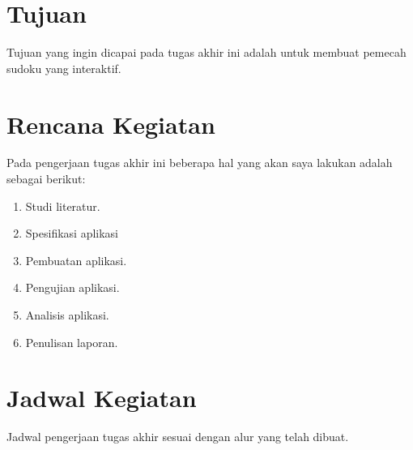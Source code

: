 \section{Tujuan}

Tujuan yang ingin dicapai pada tugas akhir ini adalah untuk membuat pemecah sudoku yang interaktif.

\section{Rencana Kegiatan}

Pada pengerjaan tugas akhir ini beberapa hal yang akan saya lakukan adalah sebagai berikut:
\begin{enumerate}
	\item Studi literatur.
	\item Spesifikasi aplikasi
	\item Pembuatan aplikasi.
	\item Pengujian aplikasi.
	\item Analisis aplikasi.
	\item Penulisan laporan.
	
\end{enumerate}

\section{Jadwal Kegiatan}

Jadwal pengerjaan tugas akhir sesuai dengan alur yang telah dibuat.

